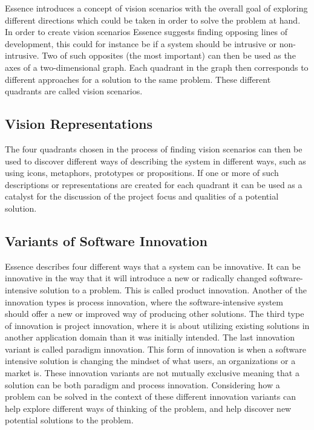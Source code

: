Essence introduces a concept of vision scenarios with the overall goal of exploring different directions which could be taken in order to solve the problem at hand. In order to create vision scenarios Essence suggests finding opposing lines of development, this could for instance be if a system should be intrusive or non-intrusive. Two of such opposites (the most important) can then be used as the axes of a two-dimensional graph. Each quadrant in the graph then corresponds to different approaches for a solution to the same problem. These different quadrants are called vision scenarios.

\subsection{Vision Representations}
\label{sub:vision_representations}

The four quadrants chosen in the process of finding vision scenarios can then be used to discover different ways of describing the system in different ways, such as using icons, metaphors, prototypes or propositions. If one or more of such descriptions or representations are created for each quadrant it can be used as a catalyst for the discussion of the project focus and qualities of a potential solution. 

\subsection{Variants of Software Innovation}
\label{sub:essence_innovation_variants}

Essence describes four different ways that a system can be innovative. It can be innovative in the way that it will introduce a new or radically changed software-intensive solution to a problem. This is called product innovation. Another of the innovation types is process innovation, where the software-intensive system should offer a new or improved way of producing other solutions. The third type of innovation is project innovation, where it is about utilizing existing solutions in another application domain than it was initially intended. The last innovation variant is called paradigm innovation. This form of innovation is when a software intensive solution is changing the mindset of what users, an organizations or a market is. These innovation variants are not mutually exclusive meaning that a solution can be both paradigm and process innovation. Considering how a problem can be solved in the context of these different innovation variants can help explore different ways of thinking of the problem, and help discover new potential solutions to the problem.

